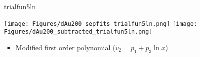 \documentclass[aspectratio=169,compress,10pt]{beamer}
\begin{document}
\begin{frame}{trialfun5ln}
\begin{center}
\texttt{[image: Figures/dAu200\_sepfits\_trialfun5ln.png]}
\texttt{[image: Figures/dAu200\_subtracted\_trialfun5ln.png]}
\end{center}
\begin{itemize}
\item Modified first order polynomial ($v_2 = p_1 + p_3\ln x$)
\end{itemize}
\end{frame}
\end{document}
